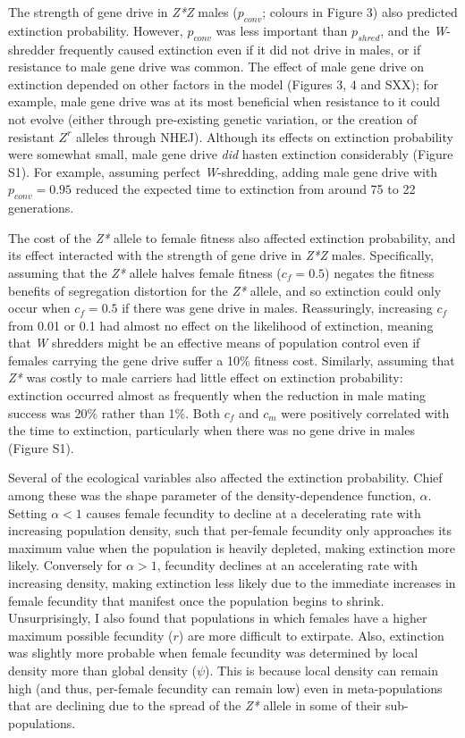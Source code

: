 \documentclass[]{rsos}%
\begin{document}
The strength of gene drive in \emph{Z*Z} males (\(p_{conv}\); colours in
Figure 3) also predicted extinction probability. However, \(p_{conv}\)
was less important than \(p_{shred}\), and the \emph{W}-shredder
frequently caused extinction even if it did not drive in males, or if
resistance to male gene drive was common. The effect of male gene drive
on extinction depended on other factors in the model (Figures 3, 4 and
SXX); for example, male gene drive was at its most beneficial when
resistance to it could not evolve (either through pre-existing genetic
variation, or the creation of resistant \(Z^r\) alleles through NHEJ).
Although its effects on extinction probability were somewhat small, male
gene drive \emph{did} hasten extinction considerably (Figure S1). For
example, assuming perfect \emph{W}-shredding, adding male gene drive
with \(p_{conv} = 0.95\) reduced the expected time to extinction from
around 75 to 22 generations.

The cost of the \emph{Z*} allele to female fitness also affected
extinction probability, and its effect interacted with the strength of
gene drive in \emph{Z*Z} males. Specifically, assuming that the
\emph{Z*} allele halves female fitness (\(c_f = 0.5\)) negates the
fitness benefits of segregation distortion for the \emph{Z*} allele, and
so extinction could only occur when \(c_f = 0.5\) if there was gene
drive in males. Reassuringly, increasing \(c_f\) from 0.01 or 0.1 had
almost no effect on the likelihood of extinction, meaning that \emph{W}
shredders might be an effective means of population control even if
females carrying the gene drive suffer a 10\% fitness cost. Similarly,
assuming that \emph{Z*} was costly to male carriers had little effect on
extinction probability: extinction occurred almost as frequently when
the reduction in male mating success was 20\% rather than 1\%. Both
\(c_f\) and \(c_m\) were positively correlated with the time to
extinction, particularly when there was no gene drive in males (Figure
S1).

Several of the ecological variables also affected the extinction
probability. Chief among these was the shape parameter of the
density-dependence function, \(\alpha\). Setting \(\alpha < 1\) causes
female fecundity to decline at a decelerating rate with increasing
population density, such that per-female fecundity only approaches its
maximum value when the population is heavily depleted, making extinction
more likely. Conversely for \(\alpha > 1\), fecundity declines at an
accelerating rate with increasing density, making extinction less likely
due to the immediate increases in female fecundity that manifest once
the population begins to shrink. Unsurprisingly, I also found that
populations in which females have a higher maximum possible fecundity
(\(r\)) are more difficult to extirpate. Also, extinction was slightly
more probable when female fecundity was determined by local density more
than global density (\(\psi\)). This is because local density can remain
high (and thus, per-female fecundity can remain low) even in
meta-populations that are declining due to the spread of the \emph{Z*}
allele in some of their sub-populations.
\end{document}
